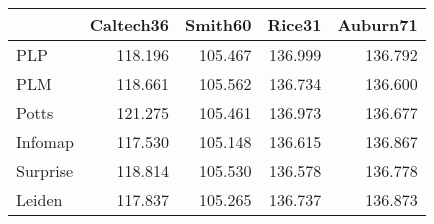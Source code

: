 \begin{tabular}{lrrrr}
\toprule
{} & Caltech36 & Smith60 &  Rice31 & Auburn71 \\
\midrule
PLP      &   118.196 & 105.467 & 136.999 &  136.792 \\
PLM      &   118.661 & 105.562 & 136.734 &  136.600 \\
Potts    &   121.275 & 105.461 & 136.973 &  136.677 \\
Infomap  &   117.530 & 105.148 & 136.615 &  136.867 \\
Surprise &   118.814 & 105.530 & 136.578 &  136.778 \\
Leiden   &   117.837 & 105.265 & 136.737 &  136.873 \\
\bottomrule
\end{tabular}
